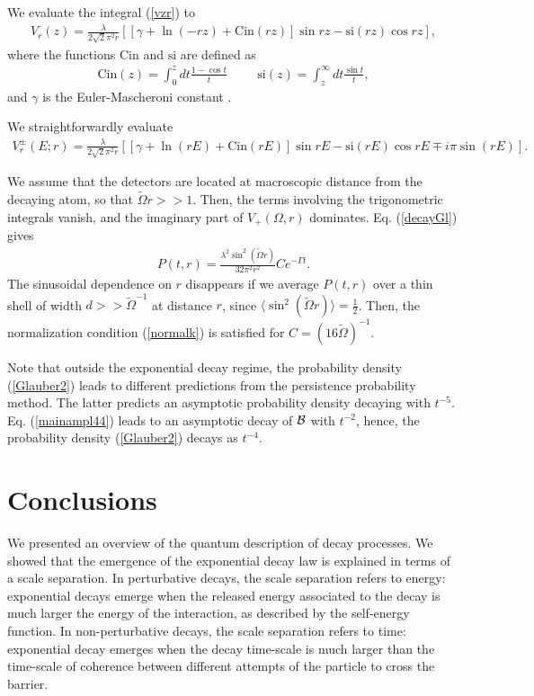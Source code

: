 \documentclass[12pt]{article}
\numberwithin{equation}{section}
\begin{document}
We evaluate the integral (\ref{vzr}) to
\begin{eqnarray}
V_r(z) =  \frac{\lambda}{2\sqrt{2} \pi^2r}  \left[ [\gamma + \ln(-rz) + \mbox{Cin}(rz)] \sin rz - \mbox{si}(rz)\cos rz\right],
 \end{eqnarray}
where the functions
 $\mbox{Cin}$ and $\mbox{si}$ are    defined as
\begin{eqnarray}
\mbox{Cin}(z) = \int_0^z dt \frac{1-\cos t}{t} \hspace{1cm} \mbox{si}(z) = \int_z^{\infty} dt \frac{\sin t}{t}, \label{CiSi}
\end{eqnarray}
and $\gamma$ is the Euler-Mascheroni constant \cite{ASt}.

We straightforwardly evaluate
\begin{eqnarray}
V_r^{\pm}(E;r) = \frac{\lambda}{2\sqrt{2} \pi^2r}  \left[ [\gamma + \ln(rE) + \mbox{Cin}(rE)] \sin rE - \mbox{si}(rE)\cos rE \mp i \pi \sin(rE)\right].
\end{eqnarray}

We assume that the detectors are located at macroscopic distance from the decaying atom, so that $\tilde{\Omega}r >> 1$. Then, the terms involving the trigonometric integrals vanish, and the imaginary part of $V_+(\Omega, r)$  dominates. Eq. (\ref{decayGl}) gives
\begin{eqnarray}
P(t, r) =  \frac{\lambda^2 \sin^2(\tilde{ \Omega} r)}{32 \pi^2 r^2} C e^{-\Gamma t}.
\end{eqnarray}
 The sinusoidal dependence  on $r$ disappears if we average $P(t, r)$ over a thin shell of width $d >> \tilde{\Omega}^{-1}$ at distance $r$, since $\langle\sin^2(\tilde{\Omega}r)\rangle = \frac{1}{2}$. Then, the normalization condition (\ref{normalk}) is satisfied for $C = (16 \tilde{\Omega})^{-1} $.

  Note that outside the exponential decay regime, the probability density (\ref{Glauber2}) leads to different predictions from the persistence probability method. The latter predicts an asymptotic probability density decaying with $t^{-5}$. Eq. (\ref{mainampl44}) leads to an asymptotic decay of ${\cal B}$ with $t^{-2}$, hence,  the probability density (\ref{Glauber2})
decays as $t^{-4}$.


\section{Conclusions}
We presented an overview of the quantum description of decay processes. We showed that the emergence of the exponential decay law is explained in terms of a scale separation. In perturbative decays, the scale separation refers to energy: exponential decays emerge when the released energy associated to the decay  is much larger the energy of the interaction, as described by the self-energy function. In non-perturbative decays, the scale separation refers to time: exponential decay emerges when the decay time-scale is much larger than the time-scale of coherence between different attempts of the particle to cross the barrier.
\end{document}
